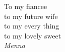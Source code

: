 \vfill
\begin{center}
	To my fiancee \\
	to my future wife \\
	to my every thing  \\
	to my lovely  sweet \\
	 \textit{Menna} 
\end{center}
\vfill

\afterpage{\blankpage}